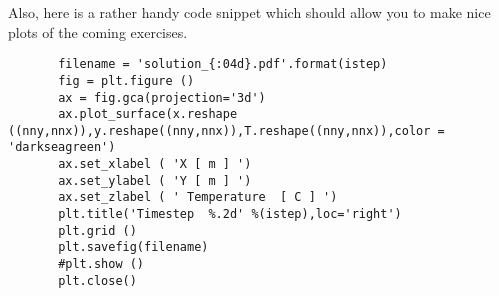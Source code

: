 Also, here is a rather handy code snippet which should allow you to make nice plots of the coming exercises.

\begin{lstlisting}
       filename = 'solution_{:04d}.pdf'.format(istep) 
       fig = plt.figure ()
       ax = fig.gca(projection='3d')
       ax.plot_surface(x.reshape ((nny,nnx)),y.reshape((nny,nnx)),T.reshape((nny,nnx)),color = 'darkseagreen')
       ax.set_xlabel ( 'X [ m ] ')
       ax.set_ylabel ( 'Y [ m ] ')
       ax.set_zlabel ( ' Temperature  [ C ] ')
       plt.title('Timestep  %.2d' %(istep),loc='right')
       plt.grid ()
       plt.savefig(filename)
       #plt.show ()
       plt.close()
\end{lstlisting}

